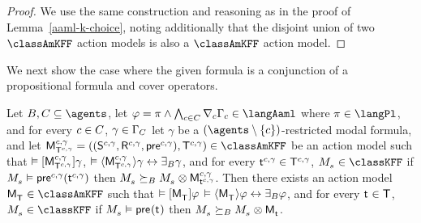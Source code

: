 \begin{proof}[Proof]
We use the same construction and reasoning as in the proof of Lemma~\ref{aaml-k-choice}, noting additionally that the disjoint union of two $\classAmKFF$ action models is also a $\classAmKFF$ action model.
\end{proof}

We next show the case where the given formula is a conjunction of a propositional formula and cover operators.

\begin{lemma}\label{aaml-k45-covers}
Let $\agentsB, \agentsC \subseteq \agents$, 
let $\phi = \pi \land \bigwedge_{\agentC \in \agentsC} \coverC \Gamma_\agentC \in \langAaml$ where $\pi \in \langPl$, and 
for every $\agentC \in \agentsC$, $\gamma \in \Gamma_\agentsC$
let $\gamma$ be a $(\agents \setminus \{\agentC\})$-restricted modal formula, and
let $\aPModelAndTuple[\agentC, \gamma]{\aStatesT[\agentC, \gamma]} \in \classAmKFF$ be an action model such that 
$\entails \actionA{\aPModel[\agentC, \gamma]{\aStatesT[\agentC, \gamma]}} \gamma$,
$\entails \actionE{\aPModel[\agentC, \gamma]{\aStatesT[\agentC, \gamma]}} \gamma \iff \someactsBs \gamma$, and
for every $\aStateT[\agentC, \gamma] \in \aStatesT[\agentC, \gamma]$, $\kPModel{\kStateS} \in \classKFF$ if $\kPModel{\kStateS} \entails \aPrecondition[\agentC, \gamma](\aStateT[\agentC, \gamma])$ then $\kPModel{\kStateS} \simulatesBs \kPModel{\kStateS} \exec \aPModel[\agentC, \gamma]{\aStateT[\agentC, \gamma]}$.
Then there exists an action model $\aPModel{\aStatesT} \in \classAmKFF$ such that 
$\entails \actionA{\aPModel{\aStatesT}} \phi$
$\entails \actionE{\aPModel{\aStatesT}} \phi \iff \someactsBs \phi$, and
for every $\aStateT \in \aStatesT$, $\kPModel{\kStateS} \in \classKFF$ if $\kPModel{\kStateS} \entails \aPrecondition(\aStateT)$ then $\kPModel{\kStateS} \simulatesBs \kPModel{\kStateS} \exec \aPModel{\aStateT}$.
\end{lemma}

